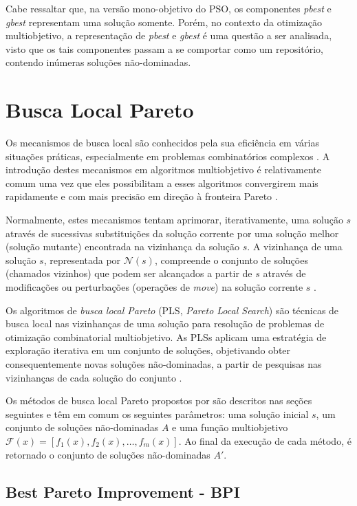 \documentclass[
	12pt,				%
	openany,			%
	oneside,	
	a4paper,			%
	brazil,				%
	]{unimontes-ppgmsc-abntex2}
\begin{document}
Cabe ressaltar que, na versão mono-objetivo do PSO, os componentes {\em pbest} e {\em gbest} representam uma solução somente. Porém, no contexto da otimização multiobjetivo, a representação de {\em pbest} e {\em gbest} é uma questão a ser analisada, visto que os tais componentes passam a se comportar como um repositório, contendo inúmeras soluções não-dominadas.

\section{Busca Local Pareto}
\label{sec:busca_local_pareto}

Os mecanismos de busca local são conhecidos pela sua eficiência em várias situações práticas, especialmente em problemas combinatórios complexos \cite{Basseur_2007}. A introdução destes mecanismos em algoritmos multiobjetivo é relativamente comum uma vez que eles possibilitam a esses algoritmos convergirem mais rapidamente e com mais precisão em direção à fronteira Pareto \cite{Joao_2013}.

Normalmente, estes mecanismos tentam aprimorar, iterativamente, uma solução $s$ através de sucessivas substituições da solução corrente por uma solução melhor (solução mutante) encontrada na vizinhança da solução $s$. A vizinhança de uma solução $s$, representada por $\mathcal{N}(s)$, compreende o conjunto de soluções (chamados vizinhos) que podem ser alcançados a partir de $s$ através de modificações ou perturbações (operações de {\em move}) na solução corrente $s$ \cite{Zachariadis_2010}.

Os algoritmos de {\em busca local Pareto} (PLS, {\em Pareto Local Search}) são técnicas de busca local nas vizinhanças de uma solução para resolução de problemas de otimização combinatorial multiobjetivo. As PLSs aplicam uma estratégia de exploração iterativa em um conjunto de soluções, objetivando obter consequentemente novas soluções não-dominadas, a partir de pesquisas nas vizinhanças de cada solução do conjunto \cite{Drugan_2012}. 

Os métodos de busca local Pareto propostos por   são descritos nas seções seguintes e têm em comum os seguintes parâmetros: uma solução inicial $s$, um conjunto de soluções não-dominadas $A$ e uma função multiobjetivo $\mathcal{F}(x)=[f_1(x), f_2(x), \dots, f_m(x)]$. Ao final da execução de cada método, é retornado o conjunto de soluções não-dominadas $A'$.

\subsection{Best Pareto Improvement - BPI} 
\end{document}
